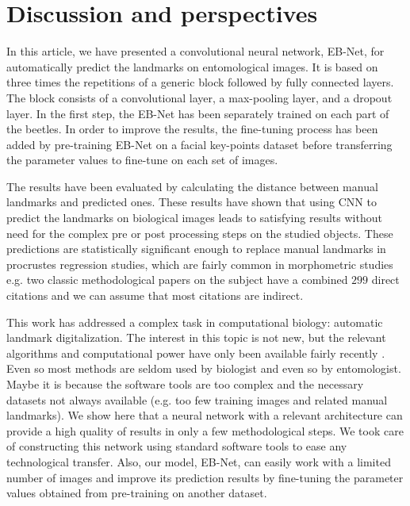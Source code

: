 \documentclass[review]{elsarticle}
\begin{document}
\section{Discussion and perspectives}

In this article, we have presented a convolutional neural network, EB-Net, for automatically predict the landmarks on entomological images. It is based on three times the repetitions of a generic block followed by fully connected layers. The block consists of a convolutional layer, a max-pooling layer, and a dropout layer. In the first step, the EB-Net has been separately trained on each part of the beetles. In order to improve the results, the fine-tuning process has been added by pre-training EB-Net on a facial key-points dataset before transferring the parameter values to fine-tune on each set of images.

The results have been evaluated by calculating the distance between manual landmarks and predicted ones. These results have shown that using CNN to predict the landmarks on biological images leads to satisfying results without need for the complex pre or post processing steps on the studied objects. These predictions are statistically significant enough to replace manual landmarks in procrustes regression studies, which are fairly common in morphometric studies e.g. two classic methodological papers on the subject\cite{goodall_procrustes_1991,collyer_method_2015} have a combined $299$ direct citations and we can assume that most citations are indirect.

This work has addressed a complex task in computational biology: automatic landmark digitalization. The interest in this topic is not new, but the relevant algorithms and computational power have only been available fairly recently \cite{palaniswamy_automatic_2010,cintas_automatic_2017,vandaele_landmark_2018,dai_locating_2019}. Even so  most methods are seldom used by biologist and even so by entomologist. 
Maybe it is because the software tools are too complex and the necessary datasets not always available (e.g. too few training images and related manual landmarks).
We show here that a neural network with a relevant architecture can provide a high quality of results in only a few methodological steps. We took care of constructing this network using standard software tools to ease any technological transfer. Also, our model, EB-Net, can easily work with a limited number of images and improve its prediction results by fine-tuning the parameter values obtained from pre-training on another dataset.
\end{document}
